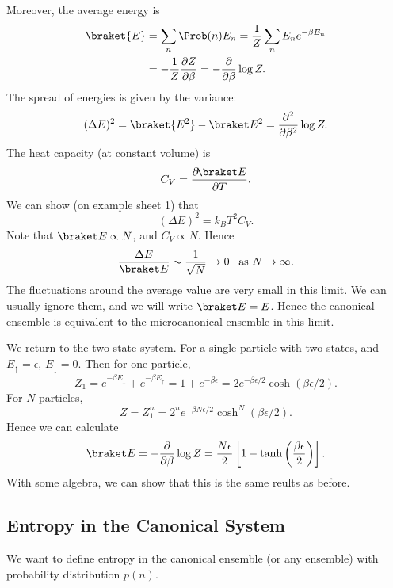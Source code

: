 \documentclass[12pt]{article}
\begin{document}
Moreover, the average energy is
\begin{align*}
	\braket{E} &= \sum_n \Prob(n) E_n = \frac{1}{Z} \sum_n E_n e^{-\beta E_n} \\
		   &= - \frac{1}{Z} \frac{\partial Z}{\partial \beta} = - \frac{\partial}{\partial \beta} \log Z.
\end{align*}
The spread of energies is given by the variance:
\[
	(\Delta E)^2 = \braket{E^2} - \braket E^2 = \frac{\partial^2}{\partial \beta^2} \log Z.
\]
The heat capacity (at constant volume) is
\[
C_V = \frac{\partial \!\braket E}{\partial T}.
\]
We can show (on example sheet 1) that
\[
	(\Delta E)^2 = k_B T^2 C_V.
\]
Note that $\braket E \propto N$, and $C_V \propto N$. Hence
\[
	\frac{\Delta E}{\braket E} \sim \frac{1}{\sqrt N} \to 0 \quad\! \text{as } N \to \infty.
\]
The fluctuations around the average value are very small in this limit. We can usually ignore them, and we will write $\braket E = E$. Hence the canonical ensemble is equivalent to the microcanonical ensemble in this limit.

\begin{exbox}
	We return to the two state system. For a single particle with two states, and $E_\uparrow = \epsilon$, $E_\downarrow = 0$. Then for one particle,
	\[
	Z_1 = e^{-\beta E_\downarrow} + e^{-\beta E_\uparrow} = 1 + e^{-\beta \epsilon} = 2 e^{-\beta \epsilon/2} \cosh (\beta \epsilon/2).
	\]
	For $N$ particles,
	\[
	Z = Z_1^n = 2^n e^{-\beta N \epsilon/2} \cosh^N(\beta \epsilon/2).
	\]
	Hence we can calculate
	\[
		\braket E = - \frac{\partial}{\partial \beta} \log Z = \frac{N \epsilon}{2} \left[ 1 - \tanh \left( \frac{\beta \epsilon}{2} \right) \right].
	\]
	With some algebra, we can show that this is the same reults as before.
\end{exbox}

\subsection{Entropy in the Canonical System}
\label{sub:can_ent}

We want to define entropy in the canonical ensemble (or any ensemble) with probability distribution $p(n)$.
\end{document}
